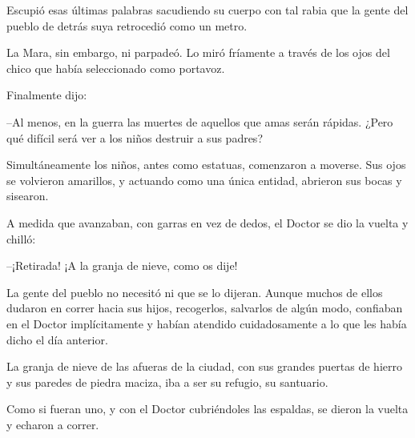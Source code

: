 Escupió esas últimas palabras sacudiendo su cuerpo con tal rabia que la gente del pueblo de detrás suya retrocedió como un metro.

La Mara, sin embargo, ni parpadeó. Lo miró fríamente a través de los ojos del chico que había seleccionado como portavoz.

Finalmente dijo:

--Al menos, en la guerra las muertes de aquellos que amas serán rápidas. ¿Pero qué difícil será ver a los niños destruir a sus padres?

Simultáneamente los niños, antes como estatuas, comenzaron a moverse. Sus ojos se volvieron amarillos, y actuando como una única entidad, abrieron sus bocas y sisearon.

A medida que avanzaban, con garras en vez de dedos, el Doctor se dio la vuelta y chilló:

--¡Retirada! ¡A la granja de nieve, como os dije!

La gente del pueblo no necesitó ni que se lo dijeran. Aunque muchos de ellos dudaron en correr hacia sus hijos, recogerlos, salvarlos de algún modo, confiaban en el Doctor implícitamente y habían atendido cuidadosamente a lo que les había dicho el día anterior.

La granja de nieve de las afueras de la ciudad, con sus grandes puertas de hierro y sus paredes de piedra maciza, iba a ser su refugio, su santuario.

Como si fueran uno, y con el Doctor cubriéndoles las espaldas, se dieron la vuelta y echaron a correr.

